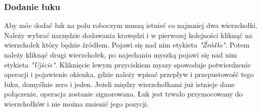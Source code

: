 \subsubsection{Dodanie łuku}
Aby móc dodać łuk na polu roboczym muszą istnieć co najmniej dwa wierzchołki. Należy wybrać narzędzie dodawania krawędzi i w pierwszej kolejności kliknąć na wierzchołek który będzie źródłem. Pojawi się nad nim etykieta \textit{"Źródło"}. Potem należy kliknąć drugi wierzchołek, po najechaniu myszką pojawi się nad nim etykieta \textit{"Ujście"}. Kliknięcie lewym przyciskiem myszy spowoduje potwierdzenie operacji i pojawienie okienka, gdzie należy wpisać przepływ i przepustowość tego łuku, domyślnie zero i jeden. Jeżeli między wierzchołkami już istnieje dane połączenie, operacja zostanie zignorowana. Łuk jest trwało przymocowany do wierzchołków i nie można zmienić jego pozycji.
